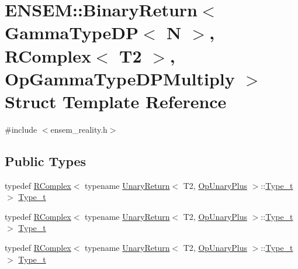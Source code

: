 \hypertarget{structENSEM_1_1BinaryReturn_3_01GammaTypeDP_3_01N_01_4_00_01RComplex_3_01T2_01_4_00_01OpGammaTypeDPMultiply_01_4}{}\section{E\+N\+S\+EM\+:\+:Binary\+Return$<$ Gamma\+Type\+DP$<$ N $>$, R\+Complex$<$ T2 $>$, Op\+Gamma\+Type\+D\+P\+Multiply $>$ Struct Template Reference}
\label{structENSEM_1_1BinaryReturn_3_01GammaTypeDP_3_01N_01_4_00_01RComplex_3_01T2_01_4_00_01OpGammaTypeDPMultiply_01_4}


{\ttfamily \#include $<$ensem\+\_\+reality.\+h$>$}

\subsection*{Public Types}
\begin{DoxyCompactItemize}
\item 
typedef \mbox{\hyperlink{classENSEM_1_1RComplex}{R\+Complex}}$<$ typename \mbox{\hyperlink{structENSEM_1_1UnaryReturn}{Unary\+Return}}$<$ T2, \mbox{\hyperlink{structENSEM_1_1OpUnaryPlus}{Op\+Unary\+Plus}} $>$\+::\mbox{\hyperlink{structENSEM_1_1BinaryReturn_3_01GammaTypeDP_3_01N_01_4_00_01RComplex_3_01T2_01_4_00_01OpGammaTypeDPMultiply_01_4_a7e6760cdc5301aa79d46345dc1f653fe}{Type\+\_\+t}} $>$ \mbox{\hyperlink{structENSEM_1_1BinaryReturn_3_01GammaTypeDP_3_01N_01_4_00_01RComplex_3_01T2_01_4_00_01OpGammaTypeDPMultiply_01_4_a7e6760cdc5301aa79d46345dc1f653fe}{Type\+\_\+t}}
\item 
typedef \mbox{\hyperlink{classENSEM_1_1RComplex}{R\+Complex}}$<$ typename \mbox{\hyperlink{structENSEM_1_1UnaryReturn}{Unary\+Return}}$<$ T2, \mbox{\hyperlink{structENSEM_1_1OpUnaryPlus}{Op\+Unary\+Plus}} $>$\+::\mbox{\hyperlink{structENSEM_1_1BinaryReturn_3_01GammaTypeDP_3_01N_01_4_00_01RComplex_3_01T2_01_4_00_01OpGammaTypeDPMultiply_01_4_a7e6760cdc5301aa79d46345dc1f653fe}{Type\+\_\+t}} $>$ \mbox{\hyperlink{structENSEM_1_1BinaryReturn_3_01GammaTypeDP_3_01N_01_4_00_01RComplex_3_01T2_01_4_00_01OpGammaTypeDPMultiply_01_4_a7e6760cdc5301aa79d46345dc1f653fe}{Type\+\_\+t}}
\item 
typedef \mbox{\hyperlink{classENSEM_1_1RComplex}{R\+Complex}}$<$ typename \mbox{\hyperlink{structENSEM_1_1UnaryReturn}{Unary\+Return}}$<$ T2, \mbox{\hyperlink{structENSEM_1_1OpUnaryPlus}{Op\+Unary\+Plus}} $>$\+::\mbox{\hyperlink{structENSEM_1_1BinaryReturn_3_01GammaTypeDP_3_01N_01_4_00_01RComplex_3_01T2_01_4_00_01OpGammaTypeDPMultiply_01_4_a7e6760cdc5301aa79d46345dc1f653fe}{Type\+\_\+t}} $>$ \mbox{\hyperlink{structENSEM_1_1BinaryReturn_3_01GammaTypeDP_3_01N_01_4_00_01RComplex_3_01T2_01_4_00_01OpGammaTypeDPMultiply_01_4_a7e6760cdc5301aa79d46345dc1f653fe}{Type\+\_\+t}}
\end{DoxyCompactItemize}


